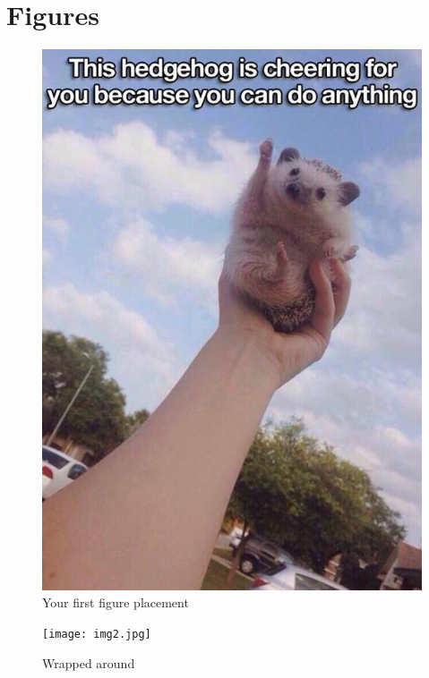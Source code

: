 \documentclass[12pt]{article}
\begin{document}
\listoffigures
\listoftables

\section{Figures}

\begin{figure}[H]
\includegraphics[width=\linewidth]{img1.jpg}
\caption{Your first figure placement}
\end{figure}

\blindtext %
\begin{figure}
	\begin{center}
		\texttt{[image: img2.jpg]}
	\end{center}
	\caption{Wrapped around}
\end{figure}
\blindtext %
\end{document}
